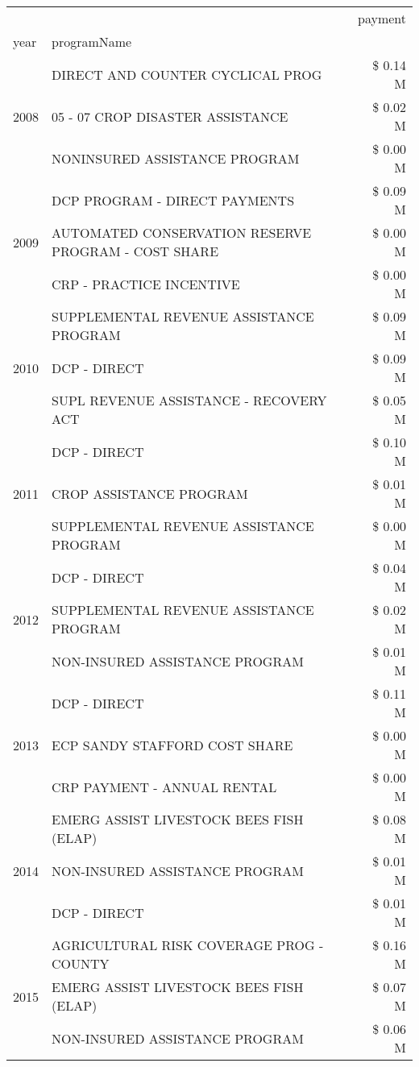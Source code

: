 \begin{tabular}{llr}
\toprule
 &  & payment \\
year & programName &  \\
\midrule
\multirow[t]{3}{*}{2008} & DIRECT AND COUNTER CYCLICAL PROG & \$ 0.14 M \\
 & 05 - 07 CROP DISASTER ASSISTANCE & \$ 0.02 M \\
 & NONINSURED ASSISTANCE PROGRAM & \$ 0.00 M \\
\cline{1-3}
\multirow[t]{3}{*}{2009} & DCP PROGRAM - DIRECT PAYMENTS & \$ 0.09 M \\
 & AUTOMATED CONSERVATION RESERVE PROGRAM - COST SHARE & \$ 0.00 M \\
 & CRP - PRACTICE INCENTIVE & \$ 0.00 M \\
\cline{1-3}
\multirow[t]{3}{*}{2010} & SUPPLEMENTAL REVENUE ASSISTANCE PROGRAM & \$ 0.09 M \\
 & DCP - DIRECT & \$ 0.09 M \\
 & SUPL REVENUE ASSISTANCE - RECOVERY ACT & \$ 0.05 M \\
\cline{1-3}
\multirow[t]{3}{*}{2011} & DCP - DIRECT & \$ 0.10 M \\
 & CROP ASSISTANCE PROGRAM & \$ 0.01 M \\
 & SUPPLEMENTAL REVENUE ASSISTANCE PROGRAM & \$ 0.00 M \\
\cline{1-3}
\multirow[t]{3}{*}{2012} & DCP - DIRECT & \$ 0.04 M \\
 & SUPPLEMENTAL REVENUE ASSISTANCE PROGRAM & \$ 0.02 M \\
 & NON-INSURED ASSISTANCE PROGRAM & \$ 0.01 M \\
\cline{1-3}
\multirow[t]{3}{*}{2013} & DCP - DIRECT & \$ 0.11 M \\
 & ECP SANDY STAFFORD COST SHARE & \$ 0.00 M \\
 & CRP PAYMENT - ANNUAL RENTAL & \$ 0.00 M \\
\cline{1-3}
\multirow[t]{3}{*}{2014} & EMERG ASSIST LIVESTOCK BEES FISH (ELAP) & \$ 0.08 M \\
 & NON-INSURED ASSISTANCE PROGRAM & \$ 0.01 M \\
 & DCP - DIRECT & \$ 0.01 M \\
\cline{1-3}
\multirow[t]{3}{*}{2015} & AGRICULTURAL RISK COVERAGE PROG - COUNTY & \$ 0.16 M \\
 & EMERG ASSIST LIVESTOCK BEES FISH (ELAP) & \$ 0.07 M \\
 & NON-INSURED ASSISTANCE PROGRAM & \$ 0.06 M \\
\cline{1-3}

\end{tabular}
